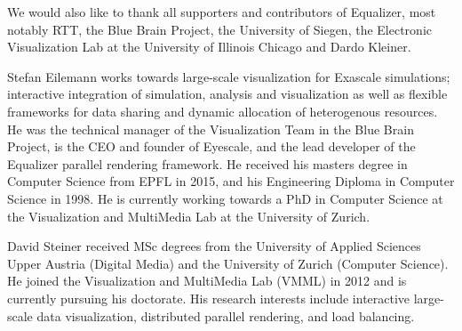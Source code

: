 \documentclass[10pt,journal,compsoc]{IEEEtran}
\begin{document}
We would also like to thank all supporters and contributors of
\textsf{Equalizer}, most notably RTT, the Blue Brain Project, the University of
Siegen, the Electronic Visualization Lab at the University of Illinois Chicago
and Dardo Kleiner.


%

\begin{IEEEbiography}{
Stefan Eilemann} works towards large-scale visualization for Exascale
simulations; interactive integration of simulation, analysis and visualization
as well as flexible frameworks for data sharing and dynamic allocation of
heterogenous resources. He was the technical manager of the Visualization Team
in the Blue Brain Project, is the CEO and founder of Eyescale, and the lead
developer of the \textsf{Equalizer} parallel rendering framework. He received
his masters degree in Computer Science from EPFL in 2015, and his Engineering
Diploma in Computer Science in 1998. He is currently working towards a PhD in
Computer Science at the Visualization and MultiMedia Lab at the University of
Zurich. \end{IEEEbiography}

\begin{IEEEbiography}{David Steiner}
received MSc degrees from the University of Applied Sciences Upper Austria (Digital Media) and the University of Zurich (Computer Science). He joined the Visualization and MultiMedia Lab (VMML) in 2012 and is currently pursuing his doctorate. His research interests include interactive large-scale data visualization, distributed parallel rendering, and load balancing.
\end{IEEEbiography}
\end{document}
